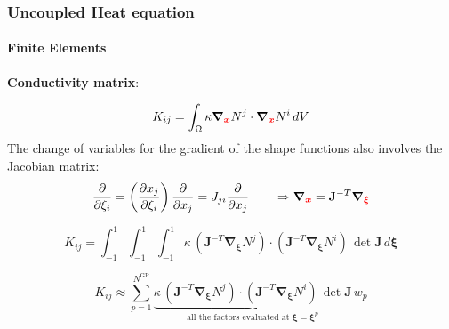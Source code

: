 \documentclass[10pt,xcolor=pdftex,dvipsnames,table]{beamer}
\begin{document}
\begin{frame}
	\frametitle{ Uncoupled Heat equation }
	\framesubtitle{ Finite Elements }
	
	\textbf{Conductivity matrix}: 
	
	\begin{equation*}
		K_{ij} = \int_{\Omega} \kappa \boldsymbol{\nabla}_{\color{red} \boldsymbol{x}} N^j \cdot \boldsymbol{\nabla}_{\color{red} \boldsymbol{x}}  N^i \, dV
	\end{equation*}		
	The change of variables for the gradient of the shape functions also involves the Jacobian matrix:
	\begin{equation*}
	\frac{\partial}{\partial\xi_i} = \left( \frac{\partial x_j}{\partial \xi_i}  \right) \frac{\partial}{\partial x_j} = J_{ji} \frac{\partial}{\partial x_j} \qquad \Rightarrow \boldsymbol{\nabla}_{\color{red}\boldsymbol{x}} = \mathbf{J}^{-T} \boldsymbol{\nabla}_{\color{red}\boldsymbol{\xi}}
	\end{equation*}	
	 
	\begin{equation*}
		K_{ij} = \int_{-1}^1\int_{-1}^1\int_{-1}^1
		\kappa\, 
		(\mathbf{J}^{-T}\boldsymbol{\nabla}_{\boldsymbol{\xi}} N^j) 
		\cdot 
		(\mathbf{J}^{-T}\boldsymbol{\nabla}_{\boldsymbol{\xi}}N^i)\,
		\det \mathbf{J} \,d\boldsymbol{\xi}
	\end{equation*}	
	
	
	\begin{equation*}
	K_{ij} \approx \sum_{p=1}^{N^{\text{GP}}} \underbrace{
		\kappa\, 
		(\mathbf{J}^{-T}\boldsymbol{\nabla}_{\boldsymbol{\xi}} N^j) 
		\cdot 
		(\mathbf{J}^{-T}\boldsymbol{\nabla}_{\boldsymbol{\xi}}N^i)\,
		\det \mathbf{J}
	}_{\text{all the factors evaluated at } \boldsymbol{\xi}=\boldsymbol{\xi}^p} \,w_p
	\end{equation*}		
	
\end{frame}

\end{document}
